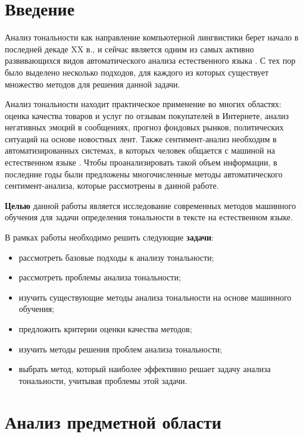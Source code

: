 \documentclass[a4paper,14pt, unknownkeysallowed]{extreport}
\begin{document}
	
\renewcommand{\contentsname}{Содержание} %
\tableofcontents
\setcounter{page}{3}

\chapter*{Введение}

Анализ тональности как направление компьютерной лингвистики берет начало в последней декаде XX в., и сейчас является одним из самых активно развивающихся видов автоматического анализа естественного языка \cite{Semina2}. С тех пор было выделено несколько подходов, для каждого из которых существует множество методов для решения данной задачи.

Анализ тональности находит практическое применение во многих областях: оценка качества товаров и услуг по отзывам покупателей в Интернете, анализ негативных эмоций в сообщениях, прогноз фондовых рынков, политических ситуаций на основе новостных лент. Также сентимент-анализ необходим в автоматизированных системах, в которых человек общается с машиной на естественном языке \cite{Bodrunova}. Чтобы проанализировать такой объем информации, в последние годы были предложены многочисленные методы автоматического сентимент-анализа, которые рассмотрены в данной работе.

\textbf{Целью} данной работы является исследование современных методов машинного обучения для задачи определения тональности в тексте на естественном языке.

В рамках работы необходимо решить следующие \textbf{задачи}:
\begin{itemize}
	\item рассмотреть базовые подходы к анализу тональности;
	\item рассмотреть проблемы анализа тональности;
	\item изучить существующие методы анализа тональности на основе машинного обучения;
	\item предложить критерии оценки качества методов;
	\item изучить методы решения проблем анализа тональности;
	\item выбрать метод, который наиболее эффективно решает задачу анализа тональности, учитывая проблемы этой задачи.
\end{itemize}

\chapter{Анализ предметной области}
\end{document}
